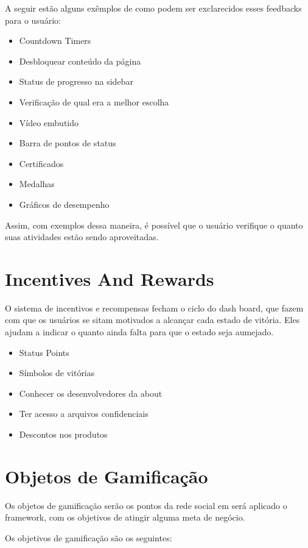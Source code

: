 A seguir estão alguns exêmplos de como podem ser exclarecidos esses feedbacks para o usuário:

\begin{itemize}
    \item Countdown Timers
    \item Desbloquear conteúdo da página
    \item Status de progresso na sidebar
    \item Verificação de qual era a melhor escolha
    \item Vídeo embutido
    \item Barra de pontos de status
    \item Certificados
    \item Medalhas
    \item Gráficos de desempenho
\end{itemize}

Assim, com exemplos dessa maneira, é possível que o usuário verifique o quanto suas atividades estão
sendo aproveitadas.

\section{Incentives And Rewards}
\label{sub:incentives_and_rewards}
O sistema de incentivos e recompensas fecham o ciclo do dash board, que fazem com que 
os usuários se sitam motivados a alcançar cada estado de vitória. Eles ajudam a indicar
o quanto ainda falta para que o estado seja aumejado.

\begin{itemize}
    \item Status Points
    \item Símbolos de vitórias
    \item Conhecer os desenvolvedores da about
    \item Ter acesso a arquivos confidenciais
    \item Descontos nos produtos
\end{itemize}

\section{Objetos de Gamificação}
\label{sec:objetodegamificacao}
Os objetos de gamificação serão os pontos da rede social em será aplicado o framework,
com os objetivos de atingir alguma meta de negócio.

Os objetivos de gamificação são os seguintes:

